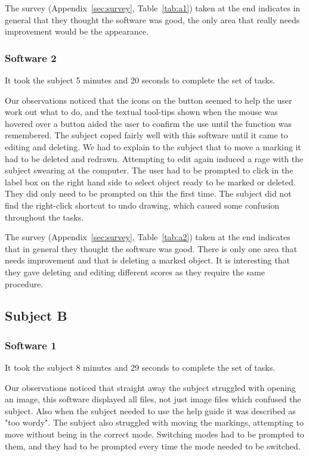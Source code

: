 \documentclass[a4paper,11pt,oneside]{article}
\begin{document}
The survey (Appendix~\ref{sec:survey}, Table~\ref{tab:a1}) taken at the end indicates in general that they thought the software was good, the only area that really needs improvement would be the appearance.

\subsubsection{Software 2}
It took the subject 5 minutes and 20 seconds to complete the set of tasks.

Our observations noticed that the icons on the button seemed to help the user work out what to do, and the textual tool-tips shown when the mouse was hovered over a button aided the user to confirm the use until the function was remembered.  The subject coped fairly well with this software until it came to editing and deleting.  We had to explain to the subject that to move a marking it had to be deleted and redrawn.  Attempting to edit again induced a rage with the subject swearing at the computer.  The user had to be prompted to click in the label box on the right hand side to select object ready to be marked or deleted.  They did only need to be prompted on this the first time. The subject did not find the right-click shortcut to undo drawing, which caused some confusion throughout the tasks.

The survey (Appendix~\ref{sec:survey}, Table~\ref{tab:a2}) taken at the end indicates that in general they thought the software was good.  There is only one area that needs improvement and that is deleting a marked object.  It is interesting that they gave deleting and editing different scores as they require the same procedure.

\subsection{Subject B}
\subsubsection{Software 1}
It took the subject 8 minutes and 29 seconds to complete the set of tasks.

Our observations noticed that straight away the subject struggled with opening an image, this software displayed all files, not just image files which confused the subject.  Also when the subject needed to use the help guide it was described as "too wordy".  The subject also struggled with moving the markings, attempting to move without being in the correct mode.  Switching modes had to be prompted to them, and they had to be prompted every time the mode needed to be switched.
\end{document}
